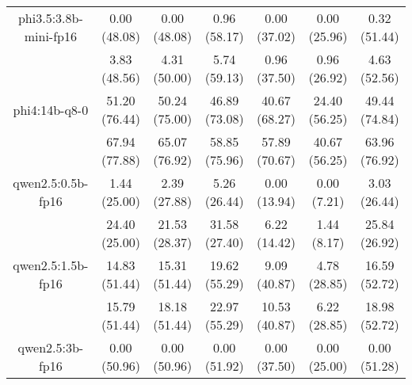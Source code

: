 \begin{table}[]
{\begin{tabular}{ccccccc}
        \multicolumn{1}{c|}{phi3.5:3.8b-mini-fp16} & 0.00 (48.08) & 0.00 (48.08) & \multicolumn{1}{c|}{0.96 (58.17)} & 0.00 (37.02) & \multicolumn{1}{c|}{0.00 (25.96)} & 0.32 (51.44) \\
        
        

        \multicolumn{1}{c|}{} & 3.83 (48.56) & 4.31 (50.00) & \multicolumn{1}{c|}{5.74 (59.13)} & 0.96 (37.50) & \multicolumn{1}{c|}{0.96 (26.92)} & 4.63 (52.56) \\
        \cline{1-7}
        

        \multicolumn{1}{c|}{phi4:14b-q8-0} & 51.20 (76.44) & 50.24 (75.00) & \multicolumn{1}{c|}{46.89 (73.08)} & 40.67 (68.27) & \multicolumn{1}{c|}{24.40 (56.25)} & 49.44 (74.84) \\
        
        

        \multicolumn{1}{c|}{} & 67.94 (77.88) & 65.07 (76.92) & \multicolumn{1}{c|}{58.85 (75.96)} & 57.89 (70.67) & \multicolumn{1}{c|}{40.67 (56.25)} & 63.96 (76.92) \\
        \cline{1-7}
        

        \multicolumn{1}{c|}{qwen2.5:0.5b-fp16} & 1.44 (25.00) & 2.39 (27.88) & \multicolumn{1}{c|}{5.26 (26.44)} & 0.00 (13.94) & \multicolumn{1}{c|}{0.00 (7.21)} & 3.03 (26.44) \\
        
        

        \multicolumn{1}{c|}{} & 24.40 (25.00) & 21.53 (28.37) & \multicolumn{1}{c|}{31.58 (27.40)} & 6.22 (14.42) & \multicolumn{1}{c|}{1.44 (8.17)} & 25.84 (26.92) \\
        \cline{1-7}
        

        \multicolumn{1}{c|}{qwen2.5:1.5b-fp16} & 14.83 (51.44) & 15.31 (51.44) & \multicolumn{1}{c|}{19.62 (55.29)} & 9.09 (40.87) & \multicolumn{1}{c|}{4.78 (28.85)} & 16.59 (52.72) \\
        
        

        \multicolumn{1}{c|}{} & 15.79 (51.44) & 18.18 (51.44) & \multicolumn{1}{c|}{22.97 (55.29)} & 10.53 (40.87) & \multicolumn{1}{c|}{6.22 (28.85)} & 18.98 (52.72) \\
        \cline{1-7}
        

        \multicolumn{1}{c|}{qwen2.5:3b-fp16} & 0.00 (50.96) & 0.00 (50.96) & \multicolumn{1}{c|}{0.00 (51.92)} & 0.00 (37.50) & \multicolumn{1}{c|}{0.00 (25.00)} & 0.00 (51.28) \\
        

\end{tabular}}
\end{table}
